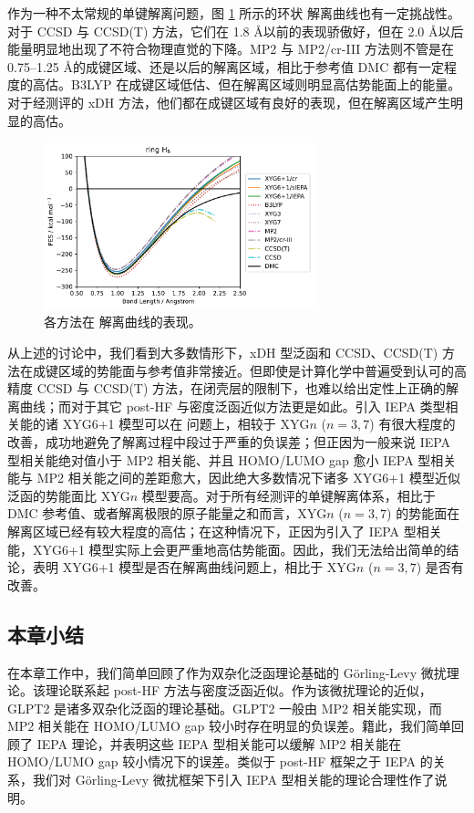 作为一种不太常规的单键解离问题，图 \ref{fig.curve-H6} 所示的环状  解离曲线也有一定挑战性。对于 CCSD 与 CCSD(T) 方法，它们在 1.8 \AA 以前的表现骄傲好，但在 2.0 \AA 以后能量明显地出现了不符合物理直觉的下降。MP2 与 MP2/cr-III 方法则不管是在 0.75--1.25 \AA 的成键区域、还是以后的解离区域，相比于参考值 DMC 都有一定程度的高估。B3LYP 在成键区域低估、但在解离区域则明显高估势能面上的能量。对于经测评的 xDH 方法，他们都在成键区域有良好的表现，但在解离区域产生明显的高估。

\begin{figure}[h]
  \centering
  \caption{各方法在  解离曲线的表现。}
  \label{fig.curve-H6}
  \includegraphics[width=0.7\textwidth]{assets/curve-H6.pdf}
\end{figure}

从上述的讨论中，我们看到大多数情形下，xDH 型泛函和 CCSD、CCSD(T) 方法在成键区域的势能面与参考值非常接近。但即使是计算化学中普遍受到认可的高精度 CCSD 与 CCSD(T) 方法，在闭壳层的限制下，也难以给出定性上正确的解离曲线；而对于其它 post-HF 与密度泛函近似方法更是如此。引入 IEPA 类型相关能的诸 XYG6+1 模型可以在  问题上，相较于 XYG$n$ ($n=3,7$) 有很大程度的改善，成功地避免了解离过程中段过于严重的负误差；但正因为一般来说 IEPA 型相关能绝对值小于 MP2 相关能、并且 HOMO/LUMO gap 愈小 IEPA 型相关能与 MP2 相关能之间的差距愈大，因此绝大多数情况下诸多 XYG6+1 模型近似泛函的势能面比 XYG$n$ 模型要高。对于所有经测评的单键解离体系，相比于 DMC 参考值、或者解离极限的原子能量之和而言，XYG$n$ ($n=3,7$) 的势能面在解离区域已经有较大程度的高估；在这种情况下，正因为引入了 IEPA 型相关能，XYG6+1 模型实际上会更严重地高估势能面。因此，我们无法给出简单的结论，表明 XYG6+1 模型是否在解离曲线问题上，相比于 XYG$n$ ($n=3,7$) 是否有改善。

\subsection{本章小结}

在本章工作中，我们简单回顾了作为双杂化泛函理论基础的 G\"orling-Levy 微扰理论。该理论联系起 post-HF 方法与密度泛函近似。作为该微扰理论的近似，GLPT2 是诸多双杂化泛函的理论基础。GLPT2 一般由 MP2 相关能实现，而 MP2 相关能在 HOMO/LUMO gap 较小时存在明显的负误差。籍此，我们简单回顾了 IEPA 理论，并表明这些 IEPA 型相关能可以缓解 MP2 相关能在 HOMO/LUMO gap 较小情况下的误差。类似于 post-HF 框架之于 IEPA 的关系，我们对 G\"orling-Levy 微扰框架下引入 IEPA 型相关能的理论合理性作了说明。

